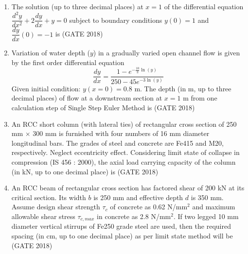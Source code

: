 \documentclass[journal,12pt,onecolumn]{IEEEtran}
\theoremstyle{remark}
\begin{document}
\begin{enumerate}
\item The solution (up to three decimal places) at $x=1$ of the differential equation $\dfrac{d^2 y}{dx^2}+2 \dfrac{dy}{dx}+y=0$ subject to boundary conditions $y(0)=1$ and $\dfrac{dy}{dx}(0) = -1$ is \underline{\hspace{3cm}}
\hfill{(GATE 2018)}
\vspace{1cm}

\item Variation of water depth ($y$) in a gradually varied open channel flow is given by the first order differential equation
\[
\dfrac{dy}{dx} = \dfrac{1-e^{-\frac{10}{3}\ln(y)}}{250-45e^{-3\ln(y)}}
\]
Given initial condition: $y(x=0) = 0.8$ m. The depth (in m, up to three decimal places) of flow at a downstream section at $x=1$ m from one calculation step of Single Step Euler Method is \underline{\hspace{3cm}}
\hfill{(GATE 2018)}
\vspace{1cm}

\item An RCC short column (with lateral ties) of rectangular cross section of 250 mm $\times$ 300 mm is furnished with four numbers of 16 mm diameter longitudinal bars. The grades of steel and concrete are Fe415 and M20, respectively. Neglect eccentricity effect. Considering limit state of collapse in compression (IS 456 : 2000), the axial load carrying capacity of the column (in kN, up to one decimal place) is \underline{\hspace{3cm}}
\hfill{(GATE 2018)}
\vspace{1cm}

\item An RCC beam of rectangular cross section has factored shear of 200 kN at its critical section. Its width $b$ is 250 mm and effective depth $d$ is 350 mm. Assume design shear strength $\tau_c$ of concrete as 0.62 N/mm$^2$ and maximum allowable shear stress $\tau_{c,max}$ in concrete as 2.8 N/mm$^2$. If two legged 10 mm diameter vertical stirrups of Fe250 grade steel are used, then the required spacing (in cm, up to one decimal place) as per limit state method will be \underline{\hspace{3cm}}
\hfill{(GATE 2018)}
\vspace{1cm}


\end{enumerate}
\end{document}

